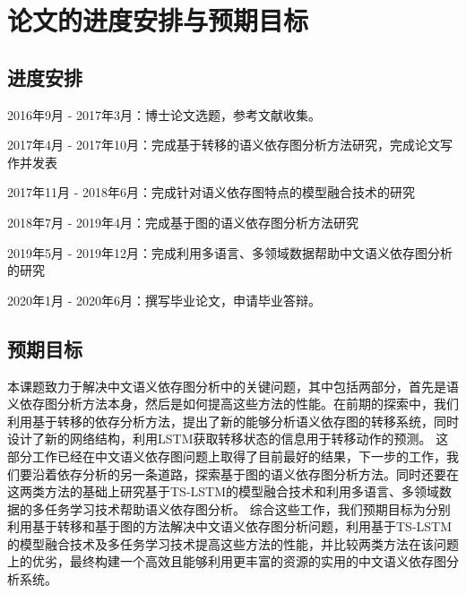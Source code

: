 \section{论文的进度安排与预期目标}

\subsection{进度安排}

2016年9月 - 2017年3月：博士论文选题，参考文献收集。

2017年4月 - 2017年10月：完成基于转移的语义依存图分析方法研究，完成论文写作并发表

2017年11月 - 2018年6月：完成针对语义依存图特点的模型融合技术的研究

2018年7月 - 2019年4月：完成基于图的语义依存图分析方法研究

2019年5月 - 2019年12月：完成利用多语言、多领域数据帮助中文语义依存图分析的研究

2020年1月 - 2020年6月：撰写毕业论文，申请毕业答辩。


\subsection{预期目标}

本课题致力于解决中文语义依存图分析中的关键问题，其中包括两部分，首先是语义依存图分析方法本身，然后是如何提高这些方法的性能。在前期的探索中，我们利用基于转移的依存分析方法，提出了新的能够分析语义依存图的转移系统，同时设计了新的网络结构，利用LSTM获取转移状态的信息用于转移动作的预测。
这部分工作已经在中文语义依存图问题上取得了目前最好的结果，下一步的工作，我们要沿着依存分析的另一条道路，探索基于图的语义依存图分析方法。同时还要在这两类方法的基础上研究基于TS-LSTM的模型融合技术和利用多语言、多领域数据的多任务学习技术帮助语义依存图分析。
综合这些工作，我们预期目标为分别利用基于转移和基于图的方法解决中文语义依存图分析问题，利用基于TS-LSTM的模型融合技术及多任务学习技术提高这些方法的性能，并比较两类方法在该问题上的优劣，最终构建一个高效且能够利用更丰富的资源的实用的中文语义依存图分析系统。

